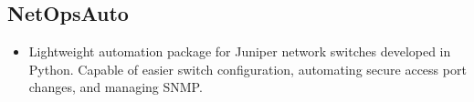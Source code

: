 
\newcommand\project[2]{
	\subsection*{#1}
	#2
	\vspace{-0.25cm}
}

\project{NetOpsAuto}{
	\begin{itemize}
		\item Lightweight automation package for Juniper network switches developed in Python. Capable of easier switch configuration, automating secure access port changes, and managing SNMP.
	\end{itemize}
}


